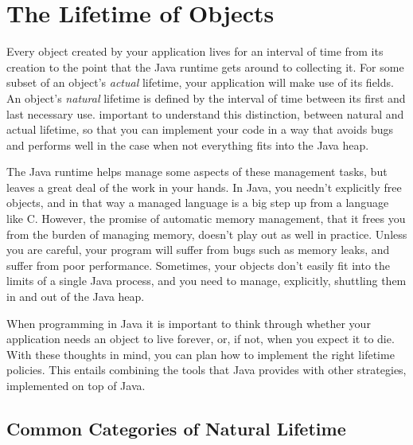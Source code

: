 \chapter{The Lifetime of Objects}

Every object created by your application lives for an interval of time from its
creation to the point that the Java runtime gets around to collecting it. For
some subset of an object's {\em actual} lifetime, your application will make use
of its fields. An object's {\em natural} lifetime is defined by the interval of
time between its first and last necessary use. %
important to understand this distinction, between natural and actual lifetime, so
that you can implement your code in a way that avoids bugs and performs well in
the case when not everything fits into the Java heap.

The Java runtime helps manage some aspects of these management tasks, but leaves
a great deal of the work in your hands. In Java, you needn't explicitly free
objects, and in that way a managed language is a big step up from a language like
C. However, the promise of automatic memory management, that it frees you from
the burden of managing memory, doesn't play out as well in practice. Unless you
are careful, your program will suffer from bugs such as memory leaks, and suffer
from poor performance. Sometimes, your objects don't easily fit into the limits
of a single Java process, and you need to manage, explicitly, shuttling
them in and out of the Java heap.

When programming in Java it is important to think through whether your
application needs an object to live forever, or, if not, when you expect it to
die. With these thoughts in mind, you can plan how to  implement the right
lifetime policies. This entails combining the tools that Java  provides with
other strategies, implemented on top of Java.

\section{Common Categories of Natural Lifetime}

